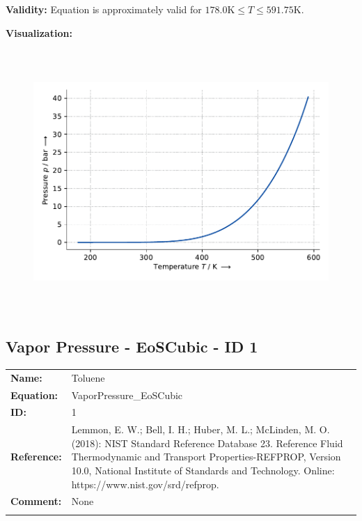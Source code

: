 \textbf{Validity:}
\newline
Equation is approximately valid for $178.0 \si{\kelvin} \leq T \leq 591.75 \si{\kelvin}$.
\newline

\textbf{Visualization:}
%
\begin{figure}[!htp]
{\noindent\includegraphics[height=10cm, keepaspectratio]{figs/ref/ref_Toluene_VaporPressure_EoS1_1.pdf}}
\end{figure}
%

\FloatBarrier
\newpage
\subsection{Vapor Pressure - EoSCubic - ID 1}
%
\begin{tabular}[l]{|lp{11.5cm}|}
\hline
\addlinespace

\textbf{Name:} & Toluene \\
\textbf{Equation:} & VaporPressure\_EoSCubic \\
\textbf{ID:} & 1 \\
\textbf{Reference:} & Lemmon, E. W.; Bell, I. H.; Huber, M. L.; McLinden, M. O. (2018): NIST Standard Reference Database 23. Reference Fluid Thermodynamic and Transport Properties-REFPROP, Version 10.0, National Institute of Standards and Technology. Online: https://www.nist.gov/srd/refprop. \\
\textbf{Comment:} & None \\

\addlinespace
\hline
\end{tabular}
\newline

